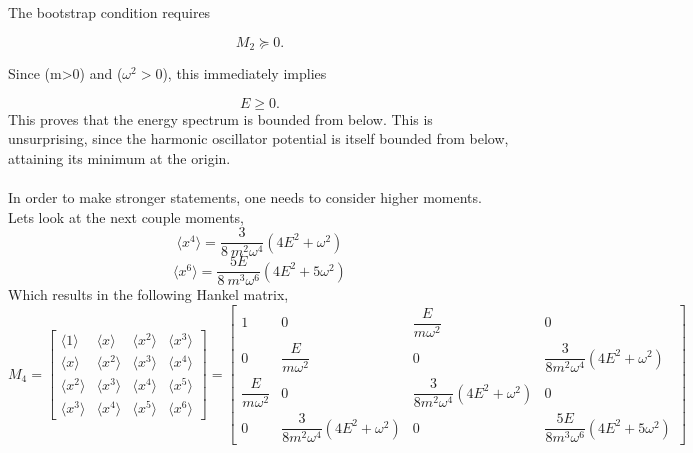 \documentclass{article}
\theoremstyle{definition}
\begin{document}
The bootstrap condition requires

\begin{equation}
M_{2}\succeq 0.
\end{equation}

Since (m>0) and ($\omega^{2}>0$), this immediately implies

\begin{equation}\label{QMBoot_HO_res1}
E\geq 0.
\end{equation}
This proves that the energy spectrum is bounded from below. This is unsurprising, since the harmonic oscillator potential is itself bounded from below, attaining its minimum at the origin. \\
\\
In order to make stronger statements, one needs to consider higher moments. Lets look at the next couple moments, 
\begin{equation*}
    \langle x^{4} \rangle = \frac{3}{8 \ m^{2}\omega^{4}} (4 E^{2} + \omega^{2})
\end{equation*}
\begin{equation*}
    \langle x^{6} \rangle = \frac{5 E}{8 \ m^{3}\omega^{6}} (4 E^{2} + 5\omega^{2})
\end{equation*}
Which results in the following Hankel matrix, 
\begin{equation}
M_{4}
=
\begin{bmatrix}
\langle 1\rangle & \langle x\rangle & \langle x^{2}\rangle & \langle x^{3}\rangle \\
\langle x\rangle & \langle x^{2}\rangle & \langle x^{3}\rangle & \langle x^{4}\rangle \\
\langle x^{2}\rangle & \langle x^{3}\rangle & \langle x^{4}\rangle & \langle x^{5}\rangle \\
\langle x^{3}\rangle & \langle x^{4}\rangle & \langle x^{5}\rangle & \langle x^{6}\rangle
\end{bmatrix}
=
\begin{bmatrix}
1 & 0 & \dfrac{E}{m\omega^{2}} & 0 \\
0 & \dfrac{E}{m\omega^{2}} & 0 &
\dfrac{3}{8m^{2}\omega^{4}}\left(4E^{2}+\omega^{2}\right) \\
\dfrac{E}{m\omega^{2}} & 0 &
\dfrac{3}{8m^{2}\omega^{4}}\left(4E^{2}+\omega^{2}\right) & 0 \\
0 &
\dfrac{3}{8m^{2}\omega^{4}}\left(4E^{2}+\omega^{2}\right) & 0 &
\dfrac{5E}{8m^{3}\omega^{6}}\left(4E^{2}+5\omega^{2}\right)
\end{bmatrix}
\end{equation}
\end{document}
